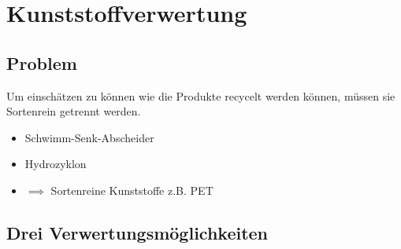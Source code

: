 
\section{Kunststoffverwertung}
\subsection{Problem}
Um einschätzen zu können wie die Produkte recycelt werden können,
müssen sie Sortenrein getrennt werden.
\begin{itemize}
    \item Schwimm-Senk-Abscheider
    \item Hydrozyklon
    \item $\implies$ Sortenreine Kunststoffe z.B. PET
\end{itemize}

\subsection{Drei Verwertungsmöglichkeiten}

